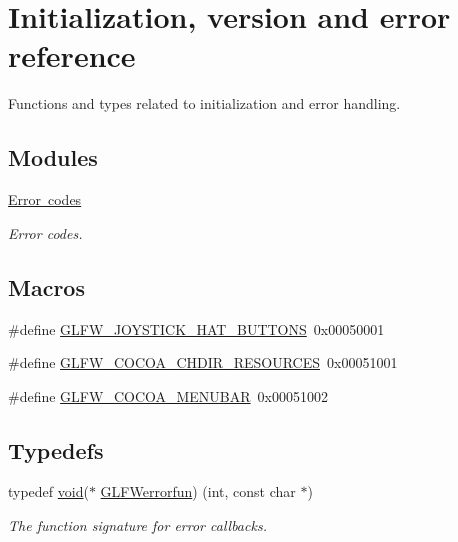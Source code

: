 \hypertarget{group__init}{}\section{Initialization, version and error reference}
\label{group__init}


Functions and types related to initialization and error handling.  


\subsection*{Modules}
\begin{DoxyCompactItemize}
\item 
\mbox{\hyperlink{group__errors}{Error codes}}
\begin{DoxyCompactList}\small\item\em Error codes. \end{DoxyCompactList}\end{DoxyCompactItemize}
\subsection*{Macros}
\begin{DoxyCompactItemize}
\item 
\#define \mbox{\hyperlink{group__init_gab9c0534709fda03ec8959201da3a9a18}{G\+L\+F\+W\+\_\+\+J\+O\+Y\+S\+T\+I\+C\+K\+\_\+\+H\+A\+T\+\_\+\+B\+U\+T\+T\+O\+NS}}~0x00050001
\item 
\#define \mbox{\hyperlink{group__init_gab937983147a3158d45f88fad7129d9f2}{G\+L\+F\+W\+\_\+\+C\+O\+C\+O\+A\+\_\+\+C\+H\+D\+I\+R\+\_\+\+R\+E\+S\+O\+U\+R\+C\+ES}}~0x00051001
\item 
\#define \mbox{\hyperlink{group__init_ga71e0b4ce2f2696a84a9b8c5e12dc70cf}{G\+L\+F\+W\+\_\+\+C\+O\+C\+O\+A\+\_\+\+M\+E\+N\+U\+B\+AR}}~0x00051002
\end{DoxyCompactItemize}
\subsection*{Typedefs}
\begin{DoxyCompactItemize}
\item 
typedef \mbox{\hyperlink{glad_8h_a950fc91edb4504f62f1c577bf4727c29}{void}}($\ast$ \mbox{\hyperlink{group__init_ga6b8a2639706d5c409fc1287e8f55e928}{G\+L\+F\+Werrorfun}}) (int, const char $\ast$)
\begin{DoxyCompactList}\small\item\em The function signature for error callbacks. \end{DoxyCompactList}\end{DoxyCompactItemize}
